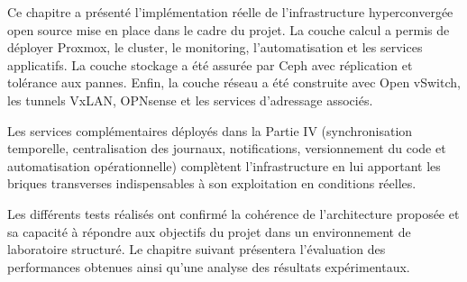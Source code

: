 \par Ce chapitre a présenté l'implémentation réelle de l'infrastructure hyperconvergée open source mise en place dans le cadre du projet. La couche calcul a permis de déployer Proxmox, le cluster, le monitoring, l'automatisation et les services applicatifs. La couche stockage a été assurée par Ceph avec réplication et tolérance aux pannes. Enfin, la couche réseau a été construite avec Open vSwitch, les tunnels VxLAN, OPNsense et les services d'adressage associés.\\

\par Les services complémentaires déployés dans la Partie IV (synchronisation temporelle, centralisation des journaux, notifications, versionnement du code et automatisation opérationnelle) complètent l'infrastructure en lui apportant les briques transverses indispensables à son exploitation en conditions réelles.\\

\par Les différents tests réalisés ont confirmé la cohérence de l'architecture proposée et sa capacité à répondre aux objectifs du projet dans un environnement de laboratoire structuré. Le chapitre suivant présentera l'évaluation des performances obtenues ainsi qu'une analyse des résultats expérimentaux.\\
